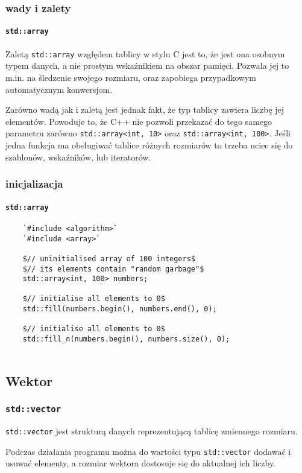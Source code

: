 \documentclass[aspectratio=169]{beamer}
\begin{document}
\begin{frame}
    \frametitle{wady i zalety}
    \framesubtitle{{\tt std::array}}

    Zaletą {\tt std::array} względem tablicy w stylu C jest to, że jest ona
    osobnym typem danych, a nie prostym wskaźnikiem na obszar pamięci. Pozwala
    jej to m.in. na śledzenie swojego rozmiaru, oraz zapobiega przypadkowym
    automatycznym konwersjom.

    \vspace{1em}

    Zarówno wadą jak i zaletą jest jednak fakt, że typ tablicy zawiera liczbę
    jej elementów. Powoduje to, że C++ nie pozwoli przekazać do tego samego
    parametru zarówno {\tt std::array<int, 10>} oraz {\tt std::array<int, 100>}.
    Jeśli jedna funkcja ma obsługiwać tablice różnych rozmiarów to trzeba uciec
    się do szablonów, wskaźników, lub iteratorów.
\end{frame}

\begin{frame}[fragile]
    \frametitle{inicjalizacja}
    \framesubtitle{{\tt std::array}}

    {\footnotesize
    \begin{lstlisting}
    `#include <algorithm>`
    `#include <array>`

    $// uninitialised array of 100 integers$
    $// its elements contain "random garbage"$
    std::array<int, 100> numbers;

    $// initialise all elements to 0$
    std::fill(numbers.begin(), numbers.end(), 0);

    $// initialise all elements to 0$
    std::fill_n(numbers.begin(), numbers.size(), 0);
                                   
    \end{lstlisting}}
\end{frame}

\subsection{Wektor}

\begin{frame}
    \frametitle{{\tt std::vector}}

    {\tt std::vector} jest strukturą danych reprezentującą tablicę zmiennego
    rozmiaru.

    Podczas działania programu można do wartości typu {\tt std::vector} dodawać
    i usuwać elementy, a rozmiar wektora dostosuje się do aktualnej ich liczby.
\end{frame}
\end{document}
